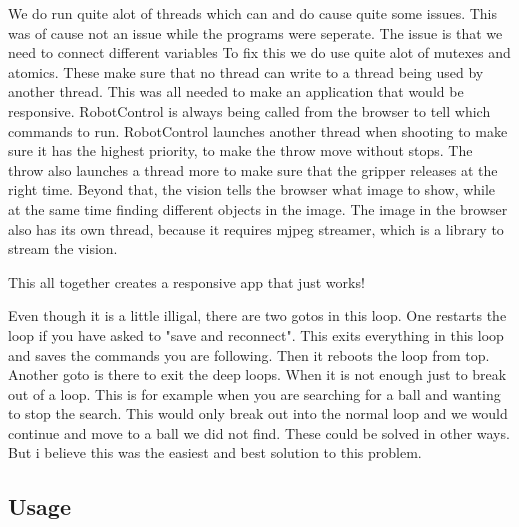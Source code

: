 We do run quite alot of threads which can and do cause quite some issues. This was of cause not an issue while the programs were seperate. The issue is that we need to connect different variables To fix this we do use quite alot of mutexes and atomics. These make sure that no thread can write to a thread being used by another thread.
This was all needed to make an application that would be responsive.
RobotControl is always being called from the browser to tell which commands to run. RobotControl launches another thread when shooting to make sure it has the highest priority, to make the throw move without stops. The throw also launches a thread more to make sure that the gripper releases at the right time.
Beyond that, the vision tells the browser what image to show, while at the same time finding different objects in the image. The image in the browser also has its own thread, because it requires mjpeg streamer, which is a library to stream the vision.

This all together creates a responsive app that just works!

Even though it is a little illigal, there are two gotos in this loop. One restarts the loop if you have asked to "save and reconnect". 
This exits everything in this loop and saves the commands you are following. Then it reboots the loop from top.
Another goto is there to exit the deep loops. When it is not enough just to break out of a loop. This is for example when you are searching for a ball and wanting to stop the search. 
This would only break out into the normal loop and we would continue and move to a ball we did not find.
These could be solved in other ways. But i believe this was the easiest and best solution to this problem.


\subsection{Usage}

